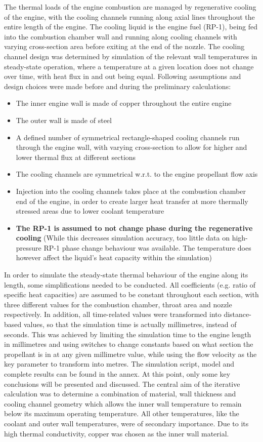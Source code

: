 \qquad The thermal loads of the engine combustion are managed by regenerative cooling of the engine, with the cooling channels running along axial lines throughout the entire length of the engine. The cooling liquid is the engine fuel (RP-1), being fed into the combustion chamber wall and running along cooling channels with varying cross-section area before exiting at the end of the nozzle. The cooling channel design was determined by simulation of the relevant wall temperatures in steady-state operation, where a temperature at a given location does not change over time, with heat flux in and out being equal. Following assumptions and design choices were made before and during the preliminary calculations:
\begin{itemize}
	\itemsep0em 
	\item	The inner engine wall is made of copper throughout the entire engine
	\item	The outer wall is made of steel
	\item	A defined number of symmetrical rectangle-shaped cooling channels run through the engine wall, with varying cross-section to allow for higher and lower thermal flux at different sections
	\item	The cooling channels are symmetrical w.r.t. to the engine propellant flow axis
	\item	Injection into the cooling channels takes place at the combustion chamber end of the engine, in order to create larger heat transfer at more thermally stressed areas due to lower coolant temperature
	\item	\textbf{The RP-1 is assumed to not change phase during the regenerative cooling} (While this decreases simulation accuracy, too little data on high-pressure RP-1 phase change behaviour was available. The temperature does however affect the liquid’s heat capacity within the simulation)
\end{itemize}

In order to simulate the steady-state thermal behaviour of the engine along its length, some simplifications needed to be conducted. All coefficients (e.g. ratio of specific heat capacities) are assumed to be constant throughout each section, with three different values for the combustion chamber, throat area and nozzle respectively. In addition, all time-related values were transformed into distance-based values, so that the simulation time is actually millimetres, instead of seconds. This was achieved by limiting the simulation time to the engine length in millimetres and using switches to change constants based on what section the propellant is in at any given millimetre value, while using the flow velocity as the key parameter to transform into metres. The simulation script, model and complete results can be found in the annex. At this point, only some key conclusions will be presented and discussed.
\clearpage
The central aim of the iterative calculation was to determine a combination of material, wall thickness and cooling channel geometry which allows the inner wall temperature to remain below its maximum operating temperature. All other temperatures, like the coolant and outer wall temperatures, were of secondary importance. Due to its high thermal conductivity, copper was chosen as the inner wall material.


